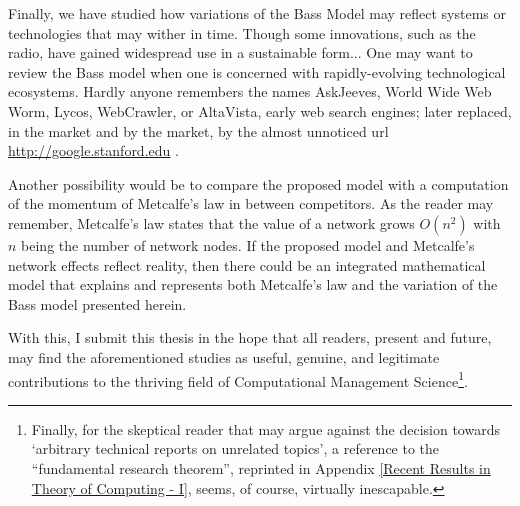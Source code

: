 Finally, we have studied how variations of the Bass Model may reflect systems or technologies that may wither in time. Though some innovations, such as the radio, have gained widespread use in a sustainable form... One may want to review the Bass model when one is concerned with rapidly-evolving technological ecosystems.  Hardly anyone remembers the names AskJeeves, World Wide Web Worm, Lycos, WebCrawler, or AltaVista, early web search engines; later replaced, in the market and by the market, by the almost unnoticed url \url{http://google.stanford.edu} \citep{brin1998anatomy}.


Another possibility would be to compare the proposed model with a computation of the momentum of Metcalfe’s law in between competitors.  As the reader may remember, Metcalfe’s law states that the value of a network grows $O(n^2)$ with $n$ being the number of network nodes.   If the proposed model and Metcalfe’s network effects reflect reality, then there could be an integrated mathematical model that explains and represents both Metcalfe’s law and the variation of the Bass model presented herein.

With this, I submit this thesis in the hope that all readers, present and future, may find the aforementioned studies as useful, genuine, and legitimate contributions to the thriving field of Computational Management Science\footnote{Finally, for the skeptical reader that may argue against the decision towards `arbitrary technical reports on unrelated topics', a reference to the ``fundamental research theorem'', reprinted in Appendix \ref{Recent Results in Theory of Computing - I}, seems, of course, virtually inescapable.}.
